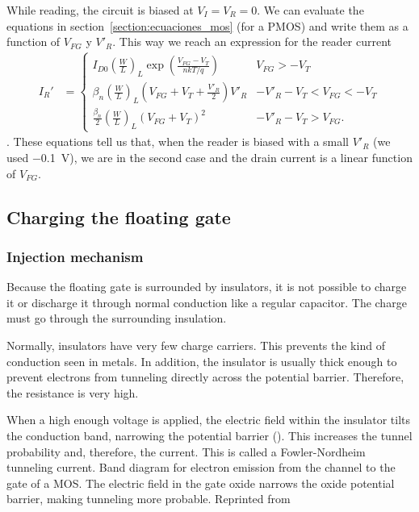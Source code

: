 While reading, the circuit is biased at $V_I=V_R=0$.
We can evaluate the equations in section~\ref{section:ecuaciones_mos}
(for a PMOS) and write them as a function of $V_{FG}$ y $V'_R$.
This way we reach an expression for the reader current
\begin{align*}
    I_R' &= \begin{cases}
        I_{D0} \left(\frac W L\right)_L
        \exp\left(\frac{V_{FG}-V_T}{nkT/q}\right)& V_{FG}>-V_T\\
        \beta_n\left(\frac W L\right)_L(V_{FG}+V_T+\frac{V'_R}2)V'_R &
        -V'_R-V_T<V_{FG}<-V_T\\
        \frac{\beta_n}2\left(\frac W L\right)_L(V_{FG}+V_T)^2 &
        -V'_R-V_T>V_{FG}.
    \end{cases}
\end{align*}
. These equations tell us that,
when the reader is biased with a small
$V'_R$ (we used \SI{-0.1}{\volt}),
we are in the second case and the drain current
is a linear function of $V_{FG}$.
\subsection{Charging the floating gate}
%
\subsubsection{Injection mechanism}
Because the floating gate is surrounded by insulators,
it is not possible to charge it or discharge it through normal conduction
like a regular capacitor.
The charge must go through the surrounding insulation.

Normally, insulators have very few charge carriers.
This prevents the kind of conduction seen in metals.
In addition, the insulator is usually thick enough
to prevent electrons from tunneling directly across the potential barrier.
Therefore, the resistance is very high.

When a high enough voltage is applied,
the electric field within the insulator tilts the conduction band,
narrowing the potential barrier
().
This increases the tunnel probability and, therefore, the current.
This is called a
Fowler-Nordheim tunneling current\cite{lenzlinger_fowlernordheim_1969}.
{Band diagram for electron emission from the channel to the gate of a MOS.
The electric field in the gate oxide narrows the oxide potential barrier,
making tunneling more probable.
Reprinted from \cite{lenzlinger_fowlernordheim_1969}}

